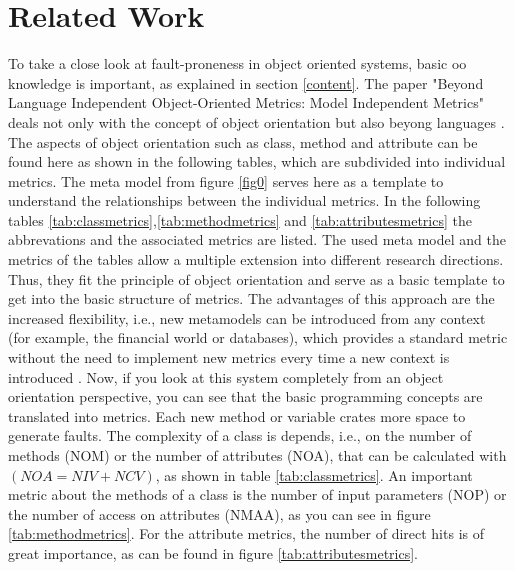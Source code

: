 \section{Related Work}\label{related}

To take a close look at fault-proneness in object oriented systems, basic oo knowledge is important, as explained in section \ref{content}. The paper "Beyond Language Independent Object-Oriented Metrics: Model Independent Metrics" deals not only with the concept of object orientation but also beyong languages \cite{lanza2002beyond}. The aspects of object orientation such as class, method and attribute can be found here as shown in the following tables, which are subdivided into individual metrics. The meta model from figure \ref{fig0} serves here as a template to understand the relationships between the individual metrics. In the following tables \ref{tab:classmetrics},\ref{tab:methodmetrics} and \ref{tab:attributesmetrics} the abbrevations and the associated metrics are listed. The used meta model and the metrics of the tables allow a multiple extension into different research directions. Thus, they fit the principle of object orientation and serve as a basic template to get into the basic structure of metrics. The advantages of this approach are the increased flexibility, i.e.,
new metamodels can be introduced from any context (for example, the financial world or databases), which provides a standard metric without the need to implement new metrics every time a new context is introduced \cite{lanza2002beyond}. Now, if you look at this system completely from an object orientation perspective, you can see that the basic programming concepts are translated into metrics. Each new method or variable crates more space to generate faults. The complexity of a class is depends, i.e., on the number of methods (NOM) or the number of attributes (NOA), that can be calculated with $(NOA = NIV + NCV)$, as shown in table \ref{tab:classmetrics}. An important metric about the methods of a class is the number of input parameters (NOP) or the number of access on attributes (NMAA), as you can see in figure \ref{tab:methodmetrics}. For the attribute metrics, the number of direct hits is of great importance, as can be found in figure \ref{tab:attributesmetrics}. 

